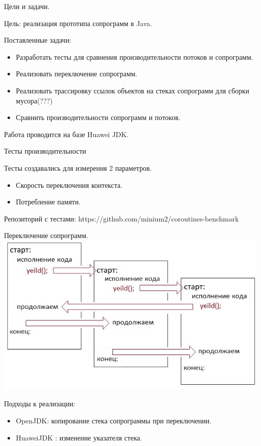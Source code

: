\begin{frame}{Цели и задачи.}
	
	Цель: реализация прототипа сопрограмм в Java.
	\par
	Поставленные задачи:
	\begin{itemize}
		\item Разработать тесты для сравнения производительности потоков и сопрограмм.
		\item Реализовать переключение сопрограмм.
		\item Реализовать трассировку ссылок объектов на стеках сопрограмм для сборки мусора(???)
		\item Сравнить производительности сопрограмм и потоков.
	\end{itemize}

	Работа проводится на базе Huawei JDK.
\end{frame}

\begin{frame}{Тесты производительности}
	
	Тесты создавались для измерения 2 параметров.
	\begin{itemize}
		\item Скорость переключения контекста.
		\item Потребление памяти.
	\end{itemize}
	Репозиторий с тестами: https://github.com/minium2/coroutines-benchmark
	
\end{frame}

\begin{frame}{Переключение сопрограмм.}
	\includegraphics[scale=0.5]{images/scheme.jpg}
	\par
	Подходы к реализации:
	\begin{itemize}
		\item OpenJDK: копирование стека сопрограммы при переключении.
		\item HuaweiJDK : изменение указателя стека.
	\end{itemize}
\end{frame}

